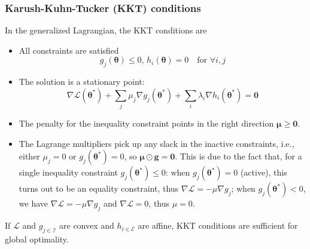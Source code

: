 \documentclass[11pt]{article}
\begin{document}
\subsubsection*{Karush-Kuhn-Tucker (KKT) conditions}
In the generalized Lagrangian, the KKT conditions are
\begin{itemize}
    \item All constraints are satisfied
    \[
    g_j(\boldsymbol{\theta}) \leq 0, \, h_i(\boldsymbol{\theta}) = 0 \quad \text{for} \, \, \forall i, j
    \]
    \item The solution is a stationary point:
    \[
    \nabla \mathcal{L}(\boldsymbol{\theta}^*) + \sum_j \mu_j \nabla g_j(\boldsymbol{\theta}^*) + \sum_i \lambda_i \nabla h_i(\boldsymbol{\theta}^*) = \mathbf{0}
    \]
    \item The penalty for the inequality constraint points in the right direction $\boldsymbol{\mu} \geq \boldsymbol{0}$.
    \item The Lagrange multipliers pick up any slack in the inactive constraints, i.e., either $\mu_j = 0$ or $g_j(\boldsymbol{\theta}^*) = 0$, so $\boldsymbol{\mu} \odot \boldsymbol{g} = \boldsymbol{0}$.
    This is due to the fact that, for a single inequality constraint $g_j(\boldsymbol{\theta}^*) \leq 0$: when $g_j(\boldsymbol{\theta}^*) = 0$ (active), this turns out to be an equality constraint, thus $\nabla \mathcal{L} = -\mu \nabla g_j$; when $g_j(\boldsymbol{\theta}^*) < 0$, we have $\nabla \mathcal{L} = -\mu \nabla g_j$ and $\nabla \mathcal{L} = 0$, thus $\mu = 0$.
\end{itemize}
If $\mathcal{L}$ and $g_{j \in \mathcal{I}}$ are convex and $h_{i \in \mathcal{E}}$ are affine, KKT conditions are sufficient for global optimality.
\end{document}
